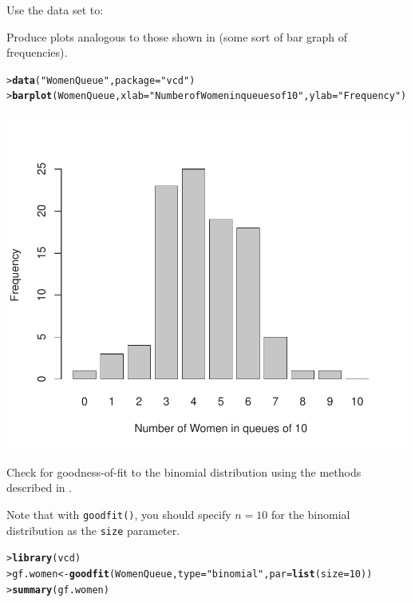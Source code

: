 \documentclass[10pt]{report}\usepackage[]{graphicx}\usepackage[]{color}
\makeatletter
\newcommand{\hlnum}[1]{\textcolor[rgb]{0.686,0.059,0.569}{#1}}%
\newcommand{\hlstr}[1]{\textcolor[rgb]{0.192,0.494,0.8}{#1}}%
\newcommand{\hlstd}[1]{\textcolor[rgb]{0.345,0.345,0.345}{#1}}%
\newcommand{\hlkwb}[1]{\textcolor[rgb]{0.69,0.353,0.396}{#1}}%
\newcommand{\hlkwc}[1]{\textcolor[rgb]{0.333,0.667,0.333}{#1}}%
\newcommand{\hlkwd}[1]{\textcolor[rgb]{0.737,0.353,0.396}{\textbf{#1}}}%
\newenvironment{kframe}{%
 \def\at@end@of@kframe{}%
 \ifinner\ifhmode%
  \def\at@end@of@kframe{\end{minipage}}%
  \begin{minipage}{\columnwidth}%
 \fi\fi%
 \def\FrameCommand##1{\hskip\@totalleftmargin \hskip-\fboxsep
 \colorbox{shadecolor}{##1}\hskip-\fboxsep
     \hskip-\linewidth \hskip-\@totalleftmargin \hskip\columnwidth}%
 \MakeFramed {\advance\hsize-\width
   \@totalleftmargin\z@ \linewidth\hsize
   \@setminipage}}%
 {\par\unskip\endMakeFramed%
 \at@end@of@kframe}
\newenvironment{knitrout}{}{} %
\renewenvironment{knitrout}{\small\renewcommand{\baselinestretch}{.85}}{} %
\makeatother
\begin{document}
\begin{Exercises}
  \exercise Use the data set  to:
  \begin{enumerate*}
    \item Produce plots analogous to those
  shown in  (some sort of bar graph of frequencies).
    \begin{ans}
\begin{knitrout}\footnotesize
{}\color{fgcolor}\begin{kframe}
\begin{alltt}
\hlstd{> }\hlkwd{data}\hlstd{(}\hlstr{"WomenQueue"}\hlstd{,} \hlkwc{package} \hlstd{=} \hlstr{"vcd"}\hlstd{)}
\hlstd{> }\hlkwd{barplot}\hlstd{(WomenQueue,}\hlkwc{xlab}\hlstd{=}\hlstr{"Number of Women in queues of 10"}\hlstd{,}\hlkwc{ylab}\hlstd{=} \hlstr{"Frequency"}\hlstd{)}
\end{alltt}
\end{kframe}

\centerline{\includegraphics[width=.5\textwidth]{soln/fig/ex3_3a-1} }



\end{knitrout}
    \end{ans}

    \item Check for goodness-of-fit to the binomial distribution using the
     methods described in .
    \begin{ans}
    Note that with \texttt{goodfit()}, you should specify $n=10$ for the binomial distribution as the \texttt{size} parameter.
\begin{knitrout}\footnotesize
{}\color{fgcolor}\begin{kframe}
\begin{alltt}
\hlstd{> }\hlkwd{library}\hlstd{(vcd)}
\hlstd{> }\hlstd{gf.women} \hlkwb{<-} \hlkwd{goodfit}\hlstd{(WomenQueue,} \hlkwc{type} \hlstd{=} \hlstr{"binomial"}\hlstd{,} \hlkwc{par}\hlstd{=}\hlkwd{list}\hlstd{(}\hlkwc{size}\hlstd{=}\hlnum{10}\hlstd{))}
\hlstd{> }\hlkwd{summary}\hlstd{(gf.women)}
\end{alltt}
\begin{verbatim}


\end{verbatim}
\end{kframe}
\end{knitrout}
\end{ans}
\end{enumerate*}
\end{Exercises}
\end{document}
